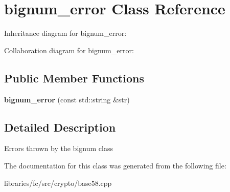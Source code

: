 \hypertarget{classbignum__error}{}\section{bignum\+\_\+error Class Reference}
\label{classbignum__error}


Inheritance diagram for bignum\+\_\+error\+:


Collaboration diagram for bignum\+\_\+error\+:
\subsection*{Public Member Functions}
\begin{DoxyCompactItemize}
\item 
\mbox{\label{classbignum__error_a500a3bab949914c4d3202cbb9241f10f}} 
{\bfseries bignum\+\_\+error} (const std\+::string \&str)
\end{DoxyCompactItemize}


\subsection{Detailed Description}
Errors thrown by the bignum class 

The documentation for this class was generated from the following file\+:\begin{DoxyCompactItemize}
\item 
libraries/fc/src/crypto/base58.\+cpp\end{DoxyCompactItemize}
